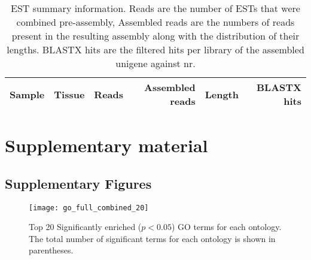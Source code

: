 \documentclass[11pt]{article}
\newcommand{\beginsupplement}{%
        \setcounter{table}{0}
        \renewcommand{\thetable}{S\arabic{table}}
        \setcounter{figure}{0}
        \renewcommand{\thefigure}{S\arabic{figure}}
        \renewcommand{\thesection}{S\arabic{section}}
        \renewcommand{\thesubsection}{S\arabic{subsection}} 
     }
\begin{document}
\begin{table}[t]
  \centering
  \begin{tabular}{llrrrr}
    \toprule
    Sample & Tissue & Reads & Assembled reads & Length & BLASTX hits \\
    \midrule
    \bottomrule

  \end{tabular}
  \label{tab:est}
  \caption{EST summary information. Reads are the number of ESTs that were combined pre-assembly, 
Assembled reads are the numbers of reads present in the resulting assembly along with the distribution 
of their lengths. BLASTX hits are the filtered hits per library of the assembled unigene against nr.}
  
\end{table}



\clearpage



\beginsupplement

\section*{Supplementary material}

\subsection*{Supplementary Figures}\label{ss:supp-fig}

\begin{figure}[t]
  \centering
  \texttt{[image: go\_full\_combined\_20]}
  \caption{Top 20 Significantly enriched ($p < 0.05$) GO terms for
    each ontology. The total number of significant terms for each
    ontology is shown in parentheses.}
  \label{fig:go_combined}
\end{figure}
\end{document}
